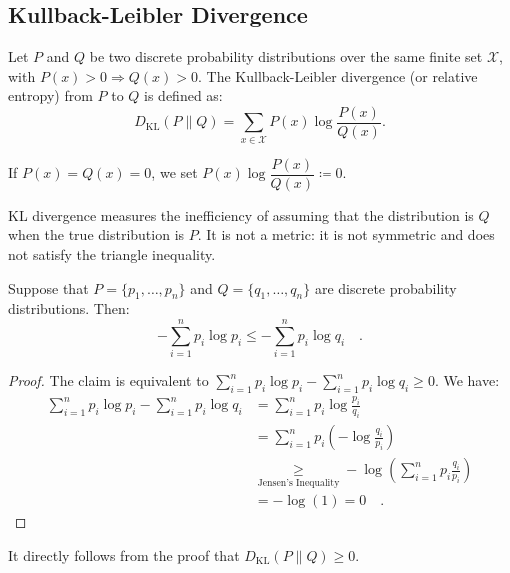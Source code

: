 \documentclass[../../main.tex]{subfiles}
\begin{document}
\subsection{Kullback-Leibler Divergence}

\begin{definition}[KL Divergence]
    Let \( P \) and \( Q \) be two discrete probability distributions over the same finite set \( \mathcal{X} \), with \( P(x) > 0 \Rightarrow Q(x) > 0 \). The Kullback-Leibler divergence (or relative entropy) from \( P \) to \( Q \) is defined as:
    \[
        D_{\mathrm{KL}}(P \| Q) = \sum_{x \in \mathcal{X}} P(x) \log \frac{P(x)}{Q(x)}.
    \]
\end{definition}

\begin{remark}
    If $P(x) = Q(x) = 0$, we set $P(x) \log \dfrac{P(x)}{Q(x)} \coloneqq 0$.
\end{remark}

\begin{remark}
KL divergence measures the inefficiency of assuming that the distribution is \( Q \) when the true distribution is \( P \). It is not a metric: it is not symmetric and does not satisfy the triangle inequality.
\end{remark}

\begin{lemma}
    Suppose that $P = \{ p_1, \dots, p_n \}$ and $Q = \{ q_1, \dots, q_n \}$ are discrete probability distributions. Then:
    \[
        - \sum_{i = 1}^{n} p_i \log p_i \leq - \sum_{i = 1}^{n} p_i \log q_i \quad .
    \]
\end{lemma}
\begin{proof}
    The claim is equivalent to $\sum_{i = 1}^{n} p_i \log p_i - \sum_{i = 1}^{n} p_i \log q_i \geq 0$. We have:
    \begin{align*}
        \sum_{i = 1}^{n} p_i \log p_i - \sum_{i = 1}^{n} p_i \log q_i &= \sum_{i = 1}^{n} p_i \log \frac{p_i}{q_i} \\
        &= \sum_{i = 1}^{n} p_i \left( - \log \frac{q_i}{p_i} \right) \\
        &\underset{\text{Jensen's Inequality}}{\geq} - \log \left( \sum_{i = 1}^{n} p_i \frac{q_i}{p_i} \right) \\
        &= - \log(1) = 0 \quad .
    \end{align*}
\end{proof}

\begin{corollary}
    It directly follows from the proof that $D_{\mathrm{KL}}(P \| Q) \geq 0$.
\end{corollary}
\end{document}
